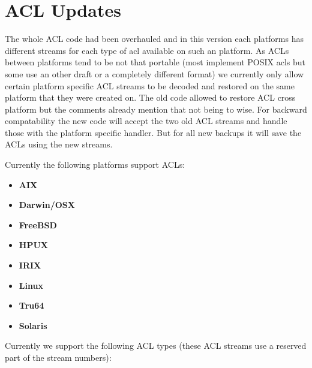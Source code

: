 \section{ACL Updates}
The whole ACL code had been overhauled and in this version each platforms has
different streams for each type of acl available on such an platform. As ACLs
between platforms tend to be not that portable (most implement POSIX acls but
some use an other draft or a completely different format) we currently only
allow certain platform specific ACL streams to be decoded and restored on the
same platform that they were created on.  The old code allowed to restore ACL
cross platform but the comments already mention that not being to wise. For
backward compatability the new code will accept the two old ACL streams and
handle those with the platform specific handler. But for all new backups it
will save the ACLs using the new streams.

Currently the following platforms support ACLs:

\begin{itemize}
 \item {\bf AIX}
 \item {\bf Darwin/OSX}
 \item {\bf FreeBSD}
 \item {\bf HPUX}
 \item {\bf IRIX}
 \item {\bf Linux}
 \item {\bf Tru64}
 \item {\bf Solaris}
\end{itemize}

Currently we support the following ACL types (these ACL streams use a reserved
part of the stream numbers):

